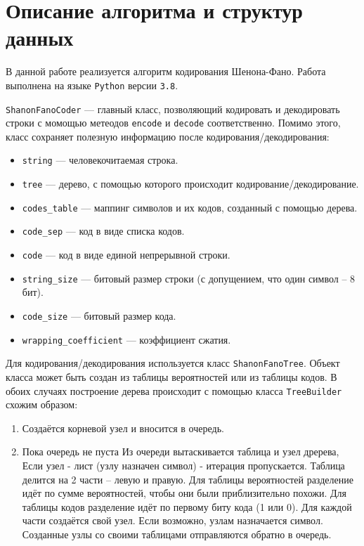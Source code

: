 \section{Описание алгоритма и структур данных}

В данной работе реализуется алгоритм кодирования Шенона-Фано.
Работа выполнена на языке \verb|Python| версии \verb|3.8|.

\verb|ShanonFanoCoder| --- главный класс, 
позволяющий кодировать и декодировать строки
с момощью метеодов \verb|encode| и \verb|decode| соответственно.
Помимо этого, класс сохраняет полезную информацию после
кодирования/декодирования:

\begin{itemize}
    \item \verb|string| --- человекочитаемая строка.
    \item \verb|tree| --- дерево, с помощью которого происходит кодирование/декодирование.
    \item \verb|codes_table| --- маппинг символов и их кодов, созданный с помощью дерева.
    \item \verb|code_sep| --- код в виде списка кодов.
    \item \verb|code| --- код в виде единой непрерывной строки.
    \item \verb|string_size| --- битовый размер строки (с допущением, что один символ -- 8 бит).
    \item \verb|code_size| --- битовый размер кода.
    \item \verb|wrapping_coefficient| --- коэффициент сжатия.
\end{itemize}

Для кодирования/декодирования 
используется класс \verb|ShanonFanoTree|.
Объект класса может быть создан из 
таблицы вероятностей или из таблицы кодов.
В обоих случаях построение дерева происходит 
с помощью класса \verb|TreeBuilder| схожим образом:

\begin{enumerate}
    \item Создаётся корневой узел и вносится в очередь.
    \item Пока очередь не пуста
    \subitem Из очереди вытаскивается таблица и узел дререва,
    \subitem Если узел - лист (узлу назначен символ) - итерация пропускается.
    \subitem Таблица делится на 2 части -- левую и правую.
             Для таблицы вероятностей разделение идёт по сумме вероятностей, 
             чтобы они были приблизительно похожи.
             Для таблицы кодов разделение идёт по первому биту кода (1 или 0).
    \subitem Для каждой части создаётся свой узел. Если возможно, узлам назначается символ.
    \subitem Созданные узлы со своими таблицами отправляются обратно в очередь.
\end{enumerate}


